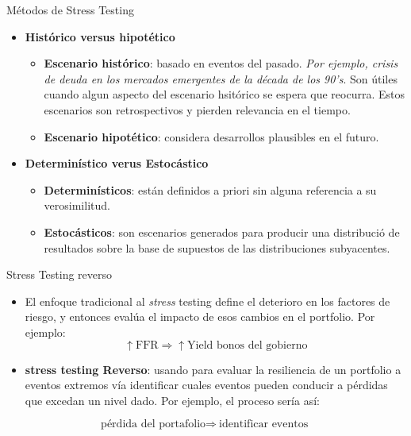 \documentclass{beamer}
\begin{document}
\begin{frame}{M\'etodos de Stress Testing}
\begin{itemize}

    \item \textbf{Hist\'orico versus hipot\'etico}
    
    \begin{itemize}
    
        \item \textbf{Escenario hist\'orico}: basado en eventos del pasado. \textit{Por ejemplo, crisis de deuda en los mercados emergentes de la d\'ecada de los 90's}. Son \'utiles cuando algun aspecto del escenario hsit\'orico se espera que reocurra. Estos escenarios son retrospectivos y pierden relevancia en el tiempo.
     
        \vspace{0.3cm}
    
        \item \textbf{Escenario hipot\'etico}: considera desarrollos plausibles en el futuro.
     \end{itemize}
     
    \item \textbf{Determin\'istico verus Estoc\'astico}

    \begin{itemize}
    
        \item \textbf{Determin\'isticos}: est\'an definidos a priori sin alguna referencia a su verosimilitud.

        \vspace{0.3cm}
        
        \item \textbf{Estoc\'asticos}: son escenarios generados para producir una distribuci\'o de resultados sobre la base de supuestos de las distribuciones subyacentes.    
    \end{itemize}
\end{itemize}
\end{frame}
\begin{frame}{Stress Testing reverso}
\begin{itemize}

    \item El enfoque tradicional al \textit{stress} testing define el deterioro en los factores de riesgo, y entonces eval\'ua el impacto de esos cambios en el portfolio. Por ejemplo: \[
\uparrow \text{FFR} \Rightarrow \uparrow \text{Yield bonos del gobierno}
\]

\item \textbf{stress testing Reverso}: usando para evaluar la resiliencia  de un portfolio a eventos extremos v\'ia identificar cuales eventos pueden conducir a p\'erdidas que excedan un nivel dado. Por ejemplo, el proceso ser\'ia as\'i:

    
\end{itemize}
\[\text{p\'erdida  del portafolio} \Rightarrow\ \text{identificar eventos }\]
\end{frame}
\end{document}

